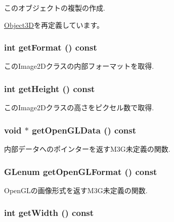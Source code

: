 このオブジェクトの複製の作成. 

\hyperlink{classm3g_1_1Object3D_a25110dac934f867b83b73ad4741a0f4}{Object3D}を再定義しています。\hypertarget{classm3g_1_1Image2D_c08e2752176d267cc4429d4d185975b8}{
\subsubsection[{getFormat}]{\setlength{\rightskip}{0pt plus 5cm}int getFormat () const}}
\label{classm3g_1_1Image2D_c08e2752176d267cc4429d4d185975b8}


このImage2Dクラスの内部フォーマットを取得. \hypertarget{classm3g_1_1Image2D_317329daf960a1759801c0f16d43d5a3}{
\subsubsection[{getHeight}]{\setlength{\rightskip}{0pt plus 5cm}int getHeight () const}}
\label{classm3g_1_1Image2D_317329daf960a1759801c0f16d43d5a3}


このImage2Dクラスの高さをピクセル数で取得. \hypertarget{classm3g_1_1Image2D_b837b1bdda59947a6d818c448965c502}{
\subsubsection[{getOpenGLData}]{\setlength{\rightskip}{0pt plus 5cm}void $\ast$ getOpenGLData () const}}
\label{classm3g_1_1Image2D_b837b1bdda59947a6d818c448965c502}


内部データへのポインターを返すM3G未定義の関数. \hypertarget{classm3g_1_1Image2D_7923da2fe82fee768ec9937a693e843c}{
\subsubsection[{getOpenGLFormat}]{\setlength{\rightskip}{0pt plus 5cm}GLenum getOpenGLFormat () const}}
\label{classm3g_1_1Image2D_7923da2fe82fee768ec9937a693e843c}


OpenGLの画像形式を返すM3G未定義の関数. \hypertarget{classm3g_1_1Image2D_f149cb053bc8b5fbc1364b5dbb934488}{
\subsubsection[{getWidth}]{\setlength{\rightskip}{0pt plus 5cm}int getWidth () const}}
\label{classm3g_1_1Image2D_f149cb053bc8b5fbc1364b5dbb934488}


